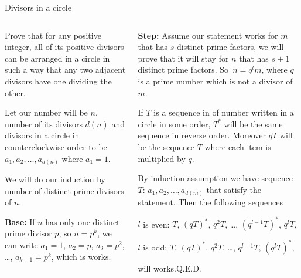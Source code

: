 \documentclass[9pt,aspectratio=169]{beamer}
\begin{document}
\begin{frame}{Divisors in a circle}
  \begin{columns}[T]
    \begin{column}{0.5\textwidth}
      \begin{problem}
        Prove that for any positive integer, all of its positive divisors can be arranged in a circle in such a way that any two adjacent divisors have one dividing the other.
      \end{problem}\pause
      Let our number will be $n$, number of its divisors $d(n)$ and divisors in a circle in counterclockwise order to be $a_1, a_2, \dots, a_{d(n)}$ where $a_1 = 1$.\pause

      We will do our induction by number of distinct prime divisors of $n$.\pause

      \textbf{Base:} If $n$ has only one distinct prime divisor $p$, so $n = p^k$, we can write $a_1 = 1$, $a_2 = p$, $a_3 = p^2$, \dots, $a_{k+1} = p^k$, which is works. \pause
    \end{column}
    \begin{column}{0.5\textwidth}
      \textbf{Step:} Assume our statement works for $m$ that has $s$ distinct prime factors, we will prove that it will stay for $n$ that has $s+1$ distinct prime factors. So~$n = q^l m$, where $q$ is a prime number which is not a divisor of $m$.\pause

      If $T$ is a sequence in of number written in a circle in some order, $T^*$ will be the same sequence in reverse order. Moreover $qT$ will be the sequence $T$ where each item is multiplied by $q$.\pause

      By induction assumption we have sequence $T$: $a_1, a_2, \dots, a_{d(m)}$ that satisfy the statement. Then the following sequences\pause

      $l$ is even: $T$, $(qT)^*$, $q^2T$, \dots, $(q^{l-1}T)^*$, $q^lT$,\pause

      $l$ is odd:  $T$, $(qT)^*$, $q^2T$, \dots, $q^{l-1}T$, $(q^lT)^*$,\pause

      will works.\pause \hfill Q.E.D.
    \end{column}
  \end{columns}
\end{frame}

\end{document}
